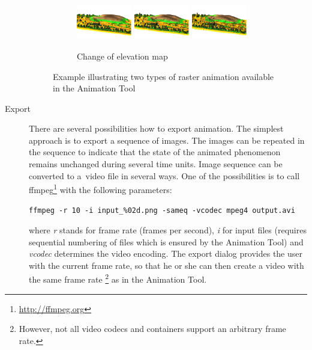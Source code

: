 \documentclass[a4paper,12pt,oneside]{book}
\newcommand{\at}{Animation Tool\xspace}
\begin{document}
\begin{description}
\begin{figure}[ht]
        \begin{subfigure}[h]{\textwidth}
        \centering
        \includegraphics[width=0.3\textwidth]{./images/elevation_map1.png}
        \includegraphics[width=0.3\textwidth]{./images/elevation_map2.png}
        \includegraphics[width=0.3\textwidth]{./images/elevation_map3.png}
        \caption{Change of elevation map}
        \label{fig:elevation_map}
        \end{subfigure}
        \caption{Example illustrating two types of raster animation available in the \at}
        \label{fig:color_elevation_map}
    \end{figure}

    \item[Export]
    There are several possibilities how to export animation.
    The simplest approach is to export a sequence of images.
    The images can be repeated in the sequence to indicate
    that the state of the animated phenomenon remains unchanged during several time units.
    Image sequence can be converted to a~video file in several ways.
    One of the possibilities is to call ffmpeg\footnote{\url{http://ffmpeg.org}}
    with the following parameters:

    \begin{footnotesize}
    \begin{lstlisting}[style=mybash]
ffmpeg -r 10 -i input_%02d.png -sameq -vcodec mpeg4 output.avi
    \end{lstlisting}
    \end{footnotesize}
      where \emph{r} stands for frame rate (frames per second),
      \emph{i} for input files (requires sequential numbering of files which is ensured by the \at) and
      \emph{vcodec} determines the video encoding.
      The export dialog provides the user with the current frame rate, so that he or she can then create
      a video with the same frame rate%
      \footnote{However, not all video codecs and containers support an arbitrary frame rate.} as in the \at.


\end{description}
\end{document}
